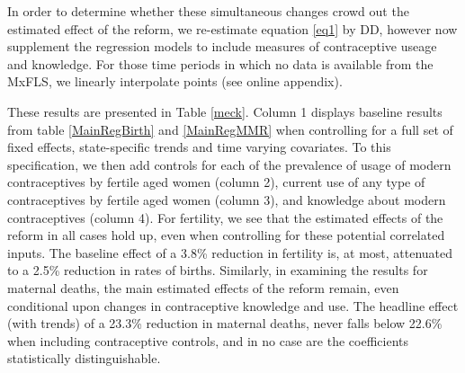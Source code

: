 \documentclass[a4paper, 11pt]{article}
\begin{document}
\begin{spacing}{2}
In order to determine whether these simultaneous changes crowd out the estimated effect of the reform, we re-estimate equation \eqref{eq1} by DD, however now supplement the regression models to include measures of contraceptive useage and knowledge.  For those time periods in which no data is available from the MxFLS, we linearly interpolate points (see online appendix).


These results are presented in Table \ref{meck}.  Column 1 displays baseline results from table \ref{MainRegBirth} and \ref{MainRegMMR} when controlling for a full set of fixed effects, state-specific trends and time varying covariates.  To this specification, we then add controls for each of the prevalence of usage of modern contraceptives by fertile aged women (column 2), current use of any type of contraceptives by fertile aged women (column 3), and knowledge about modern contraceptives (column 4).  For fertility, we see that the estimated effects of the reform in all cases hold up, even when controlling for these potential correlated inputs.  The baseline effect of a 3.8\% reduction in fertility is, at most, attenuated to a 2.5\% reduction in rates of births.  Similarly, in examining the results for maternal deaths, the main estimated effects of the reform remain, even conditional upon changes in contraceptive knowledge and use.  The headline effect (with trends) of a 23.3\% reduction in maternal deaths, never falls below 22.6\% when including contraceptive controls, and in no case are the coefficients statistically distinguishable. 


\end{spacing}
\end{document}
